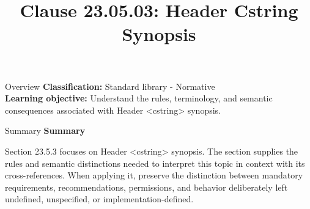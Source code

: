 \documentclass[10pt,letterpaper]{article}
\title{Clause 23.05.03: Header Cstring Synopsis}
\author{}
\date{}
\begin{document}
\maketitle
\begin{CornellOverviewBox}{Overview}
\textbf{Classification:} Standard library - Normative\\[2pt]
\textbf{Learning objective:} Understand the rules, terminology, and semantic consequences associated with Header <cstring> synopsis.
\end{CornellOverviewBox}\begin{CornellSummaryBox}{Summary}
{\sffamily\bfseries\color{Accent} Summary}\par\vspace{3pt}Section 23.5.3 focuses on Header <cstring> synopsis. The section supplies the rules and semantic distinctions needed to interpret this topic in context with its cross-references. When applying it, preserve the distinction between mandatory requirements, recommendations, permissions, and behavior deliberately left undefined, unspecified, or implementation-defined.
\end{CornellSummaryBox}
\end{document}
